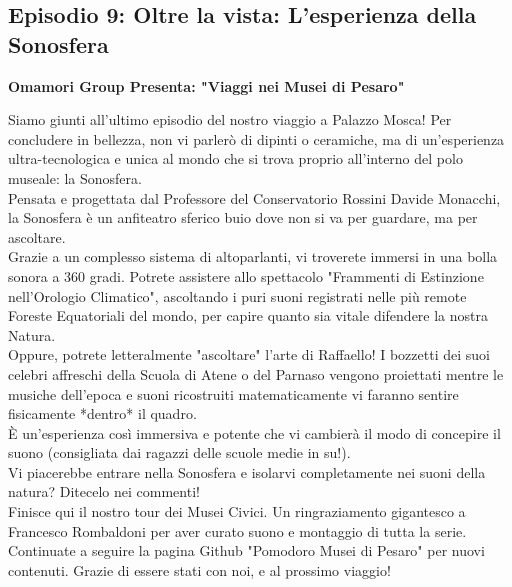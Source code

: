 \documentclass[hidelinks,12pt,a4paper]{article}
\begin{document}
\begin{flushleft}
		\subsection{Episodio 9: Oltre la vista: L'esperienza della Sonosfera}
		\begin{center}
			\textbf{Omamori Group Presenta: "Viaggi nei Musei di Pesaro"}
		\end{center}
		Siamo giunti all'ultimo episodio del nostro viaggio a Palazzo Mosca! Per concludere in bellezza, non vi parlerò di dipinti o ceramiche, ma di un'esperienza ultra-tecnologica e unica al mondo che si trova proprio all'interno del polo museale: la Sonosfera.\\
		Pensata e progettata dal Professore del Conservatorio Rossini Davide Monacchi, la Sonosfera è un anfiteatro sferico buio dove non si va per guardare, ma per ascoltare.\\
		Grazie a un complesso sistema di altoparlanti, vi troverete immersi in una bolla sonora a 360 gradi. Potrete assistere allo spettacolo "Frammenti di Estinzione nell'Orologio Climatico", ascoltando i puri suoni registrati nelle più remote Foreste Equatoriali del mondo, per capire quanto sia vitale difendere la nostra Natura.\\
		Oppure, potrete letteralmente "ascoltare" l'arte di Raffaello! I bozzetti dei suoi celebri affreschi della Scuola di Atene o del Parnaso vengono proiettati mentre le musiche dell'epoca e suoni ricostruiti matematicamente vi faranno sentire fisicamente *dentro* il quadro.\\
		È un'esperienza così immersiva e potente che vi cambierà il modo di concepire il suono (consigliata dai ragazzi delle scuole medie in su!).\\
		Vi piacerebbe entrare nella Sonosfera e isolarvi completamente nei suoni della natura? Ditecelo nei commenti!\\
		Finisce qui il nostro tour dei Musei Civici. Un ringraziamento gigantesco a Francesco Rombaldoni per aver curato suono e montaggio di tutta la serie.\\
		Continuate a seguire la pagina Github "Pomodoro Musei di Pesaro" per nuovi contenuti. Grazie di essere stati con noi, e al prossimo viaggio!\\
		
		\vspace*{\fill}
		\doclicenseThis
	\end{flushleft}
\end{document}

